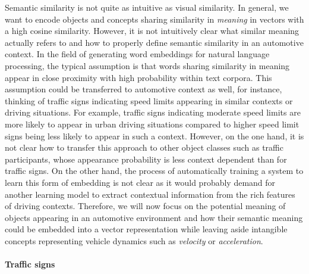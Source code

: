 Semantic similarity is not quite as intuitive as visual similarity. 
In general, we want to encode objects and concepts sharing similarity in \emph{meaning} in vectors with a high cosine similarity.
However, it is not intuitively clear what similar meaning actually refers to and how to properly define semantic similarity in an automotive context.
In the field of generating word embeddings for natural language processing, the typical assumption is that words sharing similarity in meaning appear in close proximity with high probability within text corpora.
This assumption could be transferred to automotive context as well, for instance, thinking of traffic signs indicating speed limits appearing in similar contexts or driving situations.
For example, traffic signs indicating moderate speed limits are more likely to appear in urban driving situations compared to higher speed limit signs being less likely to appear in such a context.
However, on the one hand, it is not clear how to transfer this approach to other object classes such as traffic participants, whose appearance probability is less context dependent than for traffic signs. 
On the other hand, the process of automatically training a system to learn this form of embedding is not clear as it would probably demand for another learning model to extract contextual information from the rich features of driving contexts.
Therefore, we will now focus on the potential meaning of objects appearing in an automotive environment and how their semantic meaning could be embedded into a vector representation while leaving aside intangible concepts representing vehicle dynamics such as \emph{velocity} or \emph{acceleration}.

\paragraph{Traffic signs}%
\label{par:traffic_signs}

